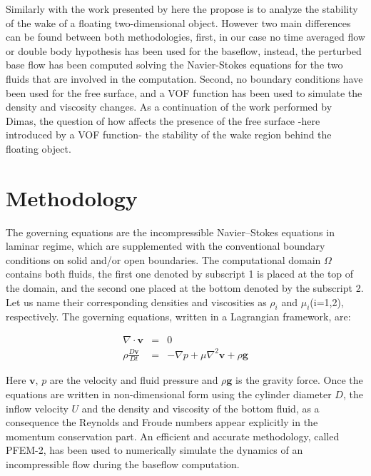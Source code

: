 \documentclass[%
 reprint,
 amsmath,amssymb,
 aps,
prl
]{revtex4-1}
\begin{document}
Similarly with the work presented by \cite{Dimas89} here the propose is to analyze the stability of the wake of a floating two-dimensional object. However two main differences can be found between both methodologies, first, in our case no time averaged flow or double body hypothesis has been used for the baseflow, instead, the perturbed base flow has been computed solving the Navier-Stokes equations for the two fluids that are involved in the computation. Second, no boundary conditions have been used for the free surface, and a VOF function \cite{Hirsch07} has been used to simulate the density and viscosity changes. As a continuation of the work performed by Dimas, the question of how affects the presence of the free surface -here introduced by a VOF function- the stability of the wake region behind the floating object.

\section{Methodology}
\label{S:Methodology}


The governing equations are the incompressible Navier–Stokes equations in laminar regime, which are supplemented with the conventional boundary conditions on solid and/or open boundaries. The computational domain $\Omega$ contains both fluids, the first one denoted by subscript 1 is placed at the top of the domain, and the second one placed at the bottom denoted by the subscript 2. Let us name their corresponding densities and viscosities as $\rho_i$ and $\mu_i$(i=1,2), respectively. The governing equations, written in a Lagrangian framework, are:

\begin{eqnarray}
  \nabla \cdot \mathbf{v} &=& 0 \label{eq:continuity} \\
  \rho\frac{D\mathbf{v}}{Dt} &=& -\nabla p + \mu \nabla^2 \mathbf{v} + \rho \mathbf{g}  \label{eq:momentum}
\end{eqnarray}

Here $\mathbf{v}$, $p$ are the velocity and fluid pressure and $\rho \mathbf{g}$ is the gravity force. Once the equations are written in non-dimensional form using the cylinder diameter $D$, the inflow velocity $U$ and the density and viscosity of the bottom fluid, as a consequence the Reynolds and Froude numbers appear explicitly in the momentum conservation part. An efficient and accurate methodology, called PFEM-2, has been used to numerically simulate the dynamics of an incompressible flow during the baseflow computation.
\end{document}
